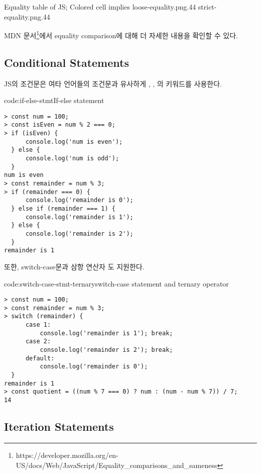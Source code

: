     {Equality table of JS; Colored cell implies \protect\footnotemark}{
        {loose-equality.png}{.44}
        {strict-equality.png}{.44}
}


MDN 문서\footnote{https://developer.mozilla.org/en-US/docs/Web/JavaScript/Equality\_comparisons\_and\_sameness}에서 equality comparison에 대해 더 자세한 내용을 확인할 수 있다.

\subsection*{Conditional Statements}

JS의 조건문은 여타 언어들의 조건문과 유사하게 , , 의 키워드를 사용한다.

\begin{code}{code:if-else-stmt}{If-else statement}
\begin{verbatim}
> const num = 100;
> const isEven = num % 2 === 0;
> if (isEven) {
      console.log('num is even');
  } else {
      console.log('num is odd');
  }
num is even
> const remainder = num % 3;
> if (remainder === 0) {
      console.log('remainder is 0');
  } else if (remainder === 1) {
      console.log('remainder is 1');
  } else {
      console.log('remainder is 2');
  }
remainder is 1
\end{verbatim}
\end{code}

또한, switch-case문과 삼항 연산자 도 지원한다.

\begin{code}{code:switch-case-stmt-ternary}{switch-case statement and ternary operator}
\begin{verbatim}
> const num = 100;
> const remainder = num % 3;
> switch (remainder) {
      case 1:
          console.log('remainder is 1'); break;
      case 2:
          console.log('remainder is 2'); break;
      default:
          console.log('remainder is 0');
  }
remainder is 1
> const quotient = ((num % 7 === 0) ? num : (num - num % 7)) / 7;
14
\end{verbatim}
\end{code}

\subsection*{Iteration Statements}

